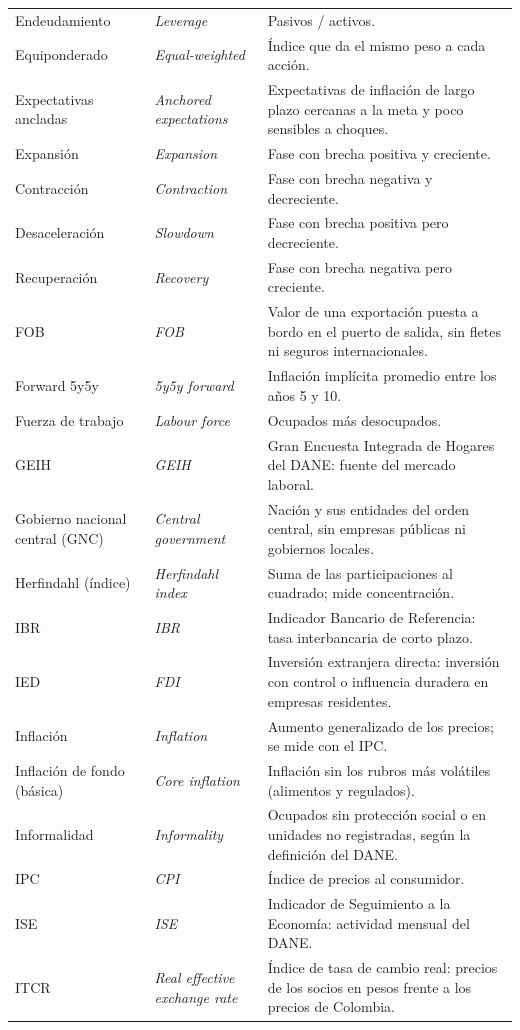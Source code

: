 \begin{longtable}{>{\raggedright\arraybackslash}p{3.2cm}>{\raggedright\arraybackslash\itshape}p{3.2cm}>{\raggedright\arraybackslash}p{8.2cm}}
Endeudamiento & Leverage & Pasivos / activos.\\
Equiponderado & Equal-weighted & Índice que da el mismo peso a cada acción.\\
Expectativas ancladas & Anchored expectations & Expectativas de inflación de largo plazo cercanas a la meta y poco sensibles a choques.\\
Expansión & Expansion & Fase con brecha positiva y creciente.\\
Contracción & Contraction & Fase con brecha negativa y decreciente.\\
Desaceleración & Slowdown & Fase con brecha positiva pero decreciente.\\
Recuperación & Recovery & Fase con brecha negativa pero creciente.\\
FOB & FOB & Valor de una exportación puesta a bordo en el puerto de salida, sin fletes ni seguros internacionales.\\
Forward 5y5y & 5y5y forward & Inflación implícita promedio entre los años 5 y 10.\\
Fuerza de trabajo & Labour force & Ocupados más desocupados.\\
GEIH & GEIH & Gran Encuesta Integrada de Hogares del DANE: fuente del mercado laboral.\\
Gobierno nacional central (GNC) & Central government & Nación y sus entidades del orden central, sin empresas públicas ni gobiernos locales.\\
Herfindahl (índice) & Herfindahl index & Suma de las participaciones al cuadrado; mide concentración.\\
IBR & IBR & Indicador Bancario de Referencia: tasa interbancaria de corto plazo.\\
IED & FDI & Inversión extranjera directa: inversión con control o influencia duradera en empresas residentes.\\
Inflación & Inflation & Aumento generalizado de los precios; se mide con el IPC.\\
Inflación de fondo (básica) & Core inflation & Inflación sin los rubros más volátiles (alimentos y regulados).\\
Informalidad & Informality & Ocupados sin protección social o en unidades no registradas, según la definición del DANE.\\
IPC & CPI & Índice de precios al consumidor.\\
ISE & ISE & Indicador de Seguimiento a la Economía: actividad mensual del DANE.\\
ITCR & Real effective exchange rate & Índice de tasa de cambio real: precios de los socios en pesos frente a los precios de Colombia.\\

\end{longtable}
